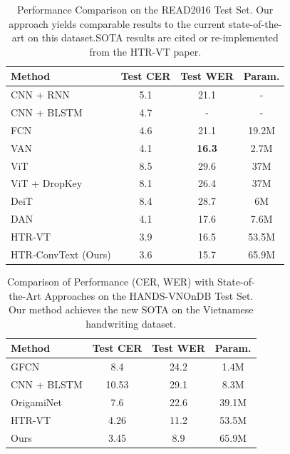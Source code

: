 \documentclass[final,5p,times]{elsarticle}
\begin{document}
\begin{table}[!t]
\centering
\caption{Performance Comparison on the READ2016 Test Set. Our approach yields comparable results to the current state-of-the-art on this dataset.SOTA results are cited or re-implemented from the HTR-VT paper.}
\label{tab:comparison_read2016}
\begin{tabular}{l|c|c|c}
\hline
\textbf{Method} & \textbf{Test CER} & \textbf{Test WER} & \textbf{Param.} \\
\hline
CNN + RNN & 5.1 & 21.1 & - \\
CNN + BLSTM & 4.7 & - & - \\
FCN & 4.6 & 21.1 & 19.2M \\
VAN & 4.1 & \textbf{16.3} & 2.7M \\
ViT & 8.5 & 29.6 & 37M \\
ViT + DropKey & 8.1 & 26.4 & 37M \\
DeiT & 8.4 & 28.7 & 6M \\
DAN & 4.1 & 17.6 & 7.6M \\
HTR-VT & 3.9 & 16.5 & 53.5M \\
HTR-ConvText (Ours) & 3.6 & 15.7 & 65.9M \\
\hline
\end{tabular}
\end{table}



\begin{table}[!t]
\centering
\caption{Comparison of Performance (CER, WER) with State-of-the-Art Approaches on the HANDS-VNOnDB Test Set. Our method achieves the new SOTA on the Vietnamese handwriting dataset.}
\label{tab:comparison_vn}
\begin{tabular}{l|c|c|c}
\hline
\textbf{Method} & \textbf{Test CER} & \textbf{Test WER}  & \textbf{Param.} \\
\hline
GFCN & 8.4 & 24.2 & 1.4M\\
CNN + BLSTM & 10.53 & 29.1 & 8.3M \\
OrigamiNet & 7.6 & 22.6 & 39.1M\\
HTR-VT & 4.26 & 11.2  & 53.5M\\
Ours &  3.45 & 8.9 & 65.9M\\
\hline
\end{tabular}
\end{table}

\end{document}
